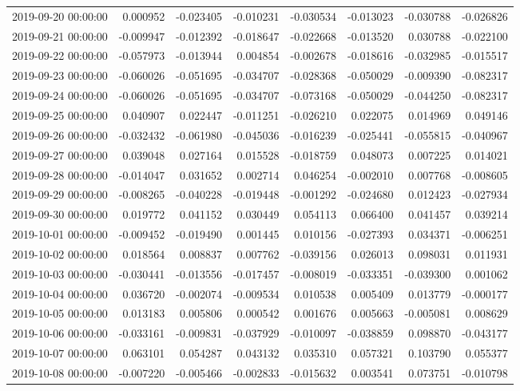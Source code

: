 \begin{tabular}{lrrrrrrr}
2019-09-20 00:00:00 & 0.000952 & -0.023405 & -0.010231 & -0.030534 & -0.013023 & -0.030788 & -0.026826 \\
2019-09-21 00:00:00 & -0.009947 & -0.012392 & -0.018647 & -0.022668 & -0.013520 & 0.030788 & -0.022100 \\
2019-09-22 00:00:00 & -0.057973 & -0.013944 & 0.004854 & -0.002678 & -0.018616 & -0.032985 & -0.015517 \\
2019-09-23 00:00:00 & -0.060026 & -0.051695 & -0.034707 & -0.028368 & -0.050029 & -0.009390 & -0.082317 \\
2019-09-24 00:00:00 & -0.060026 & -0.051695 & -0.034707 & -0.073168 & -0.050029 & -0.044250 & -0.082317 \\
2019-09-25 00:00:00 & 0.040907 & 0.022447 & -0.011251 & -0.026210 & 0.022075 & 0.014969 & 0.049146 \\
2019-09-26 00:00:00 & -0.032432 & -0.061980 & -0.045036 & -0.016239 & -0.025441 & -0.055815 & -0.040967 \\
2019-09-27 00:00:00 & 0.039048 & 0.027164 & 0.015528 & -0.018759 & 0.048073 & 0.007225 & 0.014021 \\
2019-09-28 00:00:00 & -0.014047 & 0.031652 & 0.002714 & 0.046254 & -0.002010 & 0.007768 & -0.008605 \\
2019-09-29 00:00:00 & -0.008265 & -0.040228 & -0.019448 & -0.001292 & -0.024680 & 0.012423 & -0.027934 \\
2019-09-30 00:00:00 & 0.019772 & 0.041152 & 0.030449 & 0.054113 & 0.066400 & 0.041457 & 0.039214 \\
2019-10-01 00:00:00 & -0.009452 & -0.019490 & 0.001445 & 0.010156 & -0.027393 & 0.034371 & -0.006251 \\
2019-10-02 00:00:00 & 0.018564 & 0.008837 & 0.007762 & -0.039156 & 0.026013 & 0.098031 & 0.011931 \\
2019-10-03 00:00:00 & -0.030441 & -0.013556 & -0.017457 & -0.008019 & -0.033351 & -0.039300 & 0.001062 \\
2019-10-04 00:00:00 & 0.036720 & -0.002074 & -0.009534 & 0.010538 & 0.005409 & 0.013779 & -0.000177 \\
2019-10-05 00:00:00 & 0.013183 & 0.005806 & 0.000542 & 0.001676 & 0.005663 & -0.005081 & 0.008629 \\
2019-10-06 00:00:00 & -0.033161 & -0.009831 & -0.037929 & -0.010097 & -0.038859 & 0.098870 & -0.043177 \\
2019-10-07 00:00:00 & 0.063101 & 0.054287 & 0.043132 & 0.035310 & 0.057321 & 0.103790 & 0.055377 \\
2019-10-08 00:00:00 & -0.007220 & -0.005466 & -0.002833 & -0.015632 & 0.003541 & 0.073751 & -0.010798 \\

\end{tabular}
